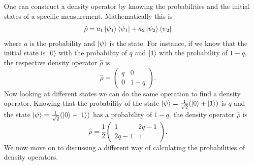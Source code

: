 \documentclass[twocolumn]{article}
\begin{document}
One can construct a density operator by knowing the probabilities and the initial states of a specific measurement. Mathematically this is
\begin{equation}
\hat{\rho}=a_1\ket{\psi_1}\bra{\psi_1}+a_2\ket{\psi_2}\bra{\psi_2}
\end{equation}
where $a$ is the probability and $\ket{\psi}$ is the state. For instance, if we know that the initial state is $\ket{0}$ with the probability of $q$ and $\ket{1}$ with the probability of $1-q$, the respective density operator $\hat{\rho}$ is
\begin{equation}
\hat{\rho}=
\begin{pmatrix}
q & 0 \\
0 & 1-q
\end{pmatrix}.
\end{equation}
Now looking at different states we can do the same operation to find a density operator. Knowing that the probability of the state $\ket{\psi}=\frac{1}{\sqrt{2}}(\ket{0}+\ket{1})$ is $q$ and the state $\ket{\psi}=\frac{1}{\sqrt{2}}(\ket{0}-\ket{1})$ has a probability of $1-q$, the density operator $\hat{\rho}$ is
\begin{equation}
\hat{\rho}=\frac{1}{2}
\begin{pmatrix}
1 & 2q-1 \\
2q-1 & 1
\end{pmatrix}.
\end{equation}
We now move on to discussing a different way of calculating the probabilities of density operators. 
\end{document}
